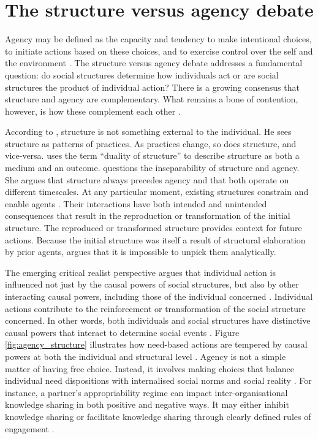 \section{The structure versus agency debate}

Agency may be defined as the capacity and tendency to make intentional choices, to initiate actions based on these choices, and to exercise control over the self and the environment \citep{goller2017human}. The structure versus agency debate addresses a fundamental question: do social structures determine how individuals act or are social structures the product of individual action? There is a growing consensus that structure and agency are complementary. What remains a bone of contention, however, is how these complement each other \citep{tan2011understanding}. \medskip

According to \citet{giddens1984constitution}, structure is not something external to the individual. He sees structure as patterns of practices. As practices change, so does structure, and vice-versa. \citet{giddens1984constitution} uses the term \enquote{duality of structure} to describe structure as both a medium and an outcome. \citet{archer1995realist} questions the inseparability of structure and agency. She argues that structure always precedes agency and that both operate on different timescales. At any particular moment, existing structures constrain and enable agents \citep{emirbayer1998agency}. Their interactions have both intended and unintended consequences that result in the reproduction or transformation of the initial structure. The reproduced or transformed structure provides context for future actions. Because the initial structure was itself a result of structural elaboration by prior agents, \citet{archer1998critical} argues that it is impossible to unpick them analytically. \medskip

The emerging critical realist perspective argues that individual action is influenced not just by the causal powers of social structures, but also by other interacting causal powers, including those of the individual concerned \citep{elder2008searching,elder2010causal,sorrell2018explaining}. Individual actions contribute to the reinforcement or transformation of the social structure concerned. In other words, both individuals and social structures have distinctive causal powers that interact to determine social events \citep{loyal2001agency}. Figure \ref{fig:agency_structure} illustrates how need-based actions are tempered by causal powers at both the individual and structural level \citep{loyal2001agency}. Agency is not a simple matter of having free choice. Instead, it involves making choices that balance individual need dispositions with internalised social norms and social reality \citep{loyal2001agency}. For instance, a partner's appropriability regime can impact inter-organisational knowledge sharing in both positive and negative ways. It may either inhibit knowledge sharing or facilitate knowledge sharing through clearly defined rules of engagement \citep{dahlander2010open,laursen2014paradox,llanes2018competitive}. \medskip

